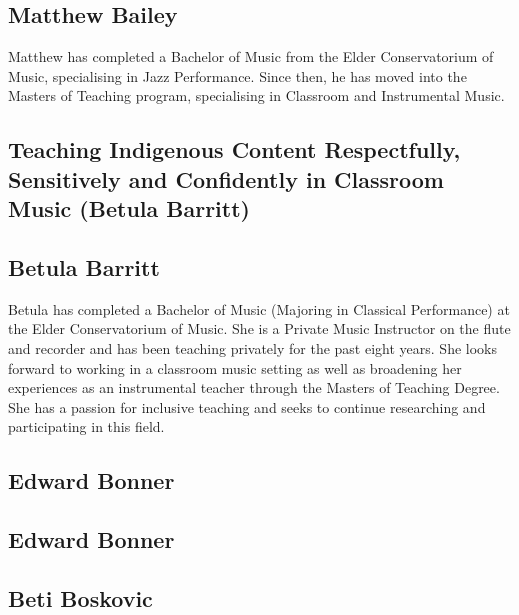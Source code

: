 \documentclass[twoside,14pt,a4paper,notitlepage]{memoir}
\begin{document}
\subsection*{Matthew Bailey}

Matthew has completed a Bachelor of Music from the Elder Conservatorium of Music, specialising in Jazz Performance. Since then, he has moved into the Masters of Teaching program, specialising in Classroom and Instrumental Music.



\subsection*{Teaching Indigenous Content Respectfully, Sensitively and Confidently in Classroom Music (Betula Barritt)}
\label{aut:barritt}

\subsection*{Betula Barritt}

Betula has completed a Bachelor of Music (Majoring in Classical Performance) at the Elder Conservatorium of Music. She is a Private Music Instructor on the flute and recorder and has been teaching privately for the past eight years. She looks forward to working in a classroom music setting as well as broadening her experiences as an instrumental teacher through the Masters of Teaching Degree. She has a passion for inclusive teaching and seeks to continue researching and participating in this field.


\subsection*{Edward Bonner}
\label{aut:bonner}

\lipsum[1-2]
\subsection*{Edward Bonner}
\lipsum[3]



\subsection*{Beti Boskovic}
\label{aut:boskovic}
\end{document}
